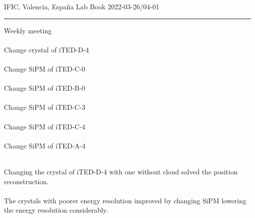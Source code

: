\begin{center}
  {\Large IFIC, Valencia, España} \hfill {\Large Lab Book} \hfill {\Large 2022-03-26/04-01}\\
  \rule{\textwidth}{1pt}
\end{center}

\begin{minipage}[t][0.45\textheight][t]{0.97\linewidth}
  \begin{minipage}[t]{0.49\textwidth}
    \hspace{10pt}Weekly meeting\\~\\
    \hspace{10pt}Change crystal of iTED-D-4\\~\\
    \hspace{10pt}Change SiPM of iTED-C-0\\~\\
    \hspace{10pt}Change SiPM of iTED-B-0\\~\\
    \hspace{10pt}Change SiPM of iTED-C-3\\~\\
    \hspace{10pt}Change SiPM of iTED-C-4\\~\\
    \hspace{10pt}Change SiPM of iTED-A-4\\~\\
  \end{minipage}
  \begin{minipage}[t]{0.49\textwidth}
    \begin{minipage}[t][0.22\textheight][t]{\textwidth}
        Changing the crystal of iTED-D-4 with one without cloud solved the position reconstruction.\\~\\
        The crystals with poorer energy resolution improved by changing SiPM lowering the energy resolution considerably.
    \end{minipage}
    \begin{minipage}[t][0.22\textheight][t]{\textwidth}
    \end{minipage}
  \end{minipage}  
\end{minipage}

